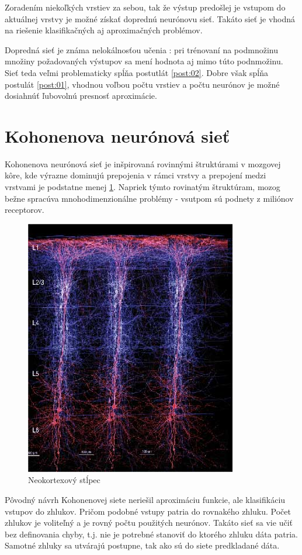 Zoradením niekoľkých vrstiev za sebou, tak že výstup predošlej je vstupom do aktuálnej
vrstvy je možné získať doprednú neurónovu sieť. Takáto sieť je vhodná na riešenie klasifikačných
aj aproximačných problémov.

Dopredná sieť je známa nelokálnosťou učenia : pri trénovaní na podmnožinu množiny
požadovaných výstupov sa mení hodnota aj mimo túto podnmožinu. Sieť teda veľmi
problematicky spĺňa postutlát \ref{post:02}. Dobre však spĺňa postulát \ref{post:01},
vhodnou voľbou počtu vrstiev a počtu neurónov je možné dosiahnúť ľubovolnú
presnosť aproximácie.

\section{Kohonenova neurónová sieť}

Kohonenova neurónová sieť je inšpirovaná rovinnými štruktúrami v mozgovej kôre,
kde výrazne dominujú prepojenia v rámci vrstvy a prepojení medzi vrstvami je
podstatne menej \ref{img:cortical_column}. Napriek týmto rovinatým štruktúram,
mozog bežne spracúva mnohodimenzionálne problémy - vsutpom sú podnety z miliónov
receptorov.

\begin{figure}[]
\center
\includegraphics[scale=.4]{../pictures/cortical_column.jpg}
\caption{Neokortexový stĺpec}
\label{img:cortical_column}
\end{figure}

Pôvodný návrh Kohonenovej siete neriešil aproximáciu funkcie, ale klasifikáciu
vstupov do zhlukov. Pričom podobné vstupy patria do rovnakého zhluku. Počet zhlukov
je voliteľný a je rovný počtu použitých neurónov. Takáto sieť sa vie učiť bez
definovania chyby, t.j. nie je potrebné stanoviť do ktorého zhluku dáta patria. Samotné
zhluky sa utvárajú postupne, tak ako sú do siete predkladané dáta.

